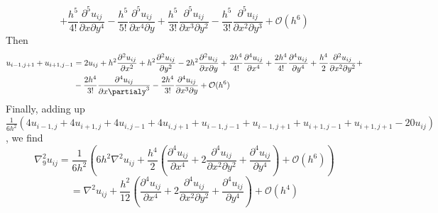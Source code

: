 \documentclass{article}
\begin{document}
\[+ \frac{h^5}{4!}\frac{\partial^5 u_{ij}}{\partial x \partial y^4} - \frac{h^5}{5!}\frac{\partial^5 u_{ij}}{\partial x^4 \partial y} + \frac{h^5}{3!}\frac{\partial^5 u_{ij}}{\partial x^3 \partial y^2} - \frac{h^5}{3!}\frac{\partial^5 u_{ij}}{\partial x^2 \partial y^3} + \mathcal{O}(h^6)\]
Then
\begin{equation} 
    \begin{split}
     u_{i-1,j+1} + u_{i+1,j-1} &= 2u_{ij} + h^2\frac{\partial^2 u_{ij}}{\partial x^2} + h^2\frac{\partial^2 u_{ij}}{\partial y^2} - 2h^2\frac{\partial^2 u_{ij}}{\partial x \partial y} + \frac{2h^4}{4!}\frac{\partial^4 u_{ij}}{\partial x^4} + \frac{2h^4}{4!}\frac{\partial^4 u_{ij}}{\partial y^4} + \frac{h^4}{2}\frac{\partial^2 u_{ij}}{\partial x^2 \partial y^2} + \\
     & - \frac{2h^4}{3!}\frac{\partial^4 u_{ij}}{\partial x \partialy^3} - \frac{2h^4}{3!}\frac{\partial^4 u_{ij}}{\partial x^3 \partial y} +     \mathcal{O}(h^6)
    \end{split}
\end{equation}
Finally, adding up $\frac{1}{6h^2}(4u_{i-1,j} + 4u_{i+1,j} + 4u_{i,j-1} + 4u_{i,j+1} + u_{i-1,j-1} + u_{i-1,j+1} + u_{i+1,j-1} + u_{i+1,j+1} - 20u_{ij})$, we find
\[\nabla_9^2 u_{ij} = \frac{1}{6h^2}\left( 6h^2\nabla^2u_{ij} + \frac{h^4}{2}\left(\frac{\partial^4u_{ij}}{\partial x^4} + 2\frac{\partial^4u_{ij}}{\partial x^2 \partial y^2} + \frac{\partial^4 u_{ij}}{\partial y^4}\right) +\mathcal{O}(h^6) \right)\]
\[ = \nabla^2 u_{ij} + \frac{h^2}{12}\left( \frac{\partial^4u_{ij}}{\partial x^4} + 2\frac{\partial^4u_{ij}}{\partial x^2 \partial y^2} + \frac{\partial^4 u_{ij}}{\partial y^4} \right) + \mathcal{O}(h^4)\]
\end{document}
